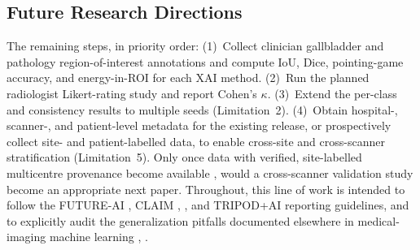 \subsection{Future Research Directions}
\label{sec:future-research}

The remaining steps, in priority order: (1)~Collect clinician gallbladder and pathology region-of-interest annotations and compute IoU, Dice, pointing-game accuracy, and energy-in-ROI for each XAI method. (2)~Run the planned radiologist Likert-rating study and report Cohen's $\kappa$. (3)~Extend the per-class and consistency results to multiple seeds (Limitation~2). (4)~Obtain hospital-, scanner-, and patient-level metadata for the existing release, or prospectively collect site- and patient-labelled data, to enable cross-site and cross-scanner stratification (Limitation~5). Only once data with verified, site-labelled multicentre provenance become available \cite{ref50}, would a cross-scanner validation study become an appropriate next paper. Throughout, this line of work is intended to follow the FUTURE-AI \cite{ref51}, CLAIM \cite{ref52}, \cite{ref53}, and TRIPOD+AI \cite{ref54} reporting guidelines, and to explicitly audit the generalization pitfalls documented elsewhere in medical-imaging machine learning \cite{ref55}, \cite{ref56}.
